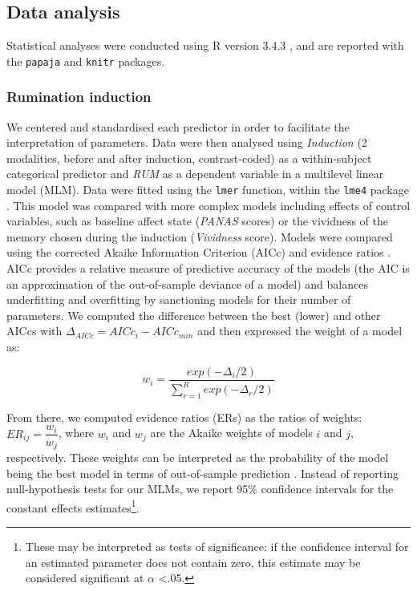 \documentclass[12pt,]{book}
\let\rmarkdownfootnote\footnote%
\def\footnote{\protect\rmarkdownfootnote}
\theoremstyle{definition}
\theoremstyle{definition}
\theoremstyle{definition}
\theoremstyle{remark}
\begin{document}
\subsection{Data analysis}\label{data-analysis}

Statistical analyses were conducted using R version 3.4.3
\citep{R-base}, and are reported with the \texttt{papaja}
\citep{R-papaja} and \texttt{knitr} \citep{R-knitr} packages.

\subsubsection{Rumination induction}\label{rumination-induction-1}

We centered and standardised each predictor in order to facilitate the
interpretation of parameters. Data were then analysed using
\emph{Induction} (2 modalities, before and after induction,
contrast-coded) as a within-subject categorical predictor and \emph{RUM}
as a dependent variable in a multilevel linear model (MLM). Data were
fitted using the \texttt{lmer} function, within the \texttt{lme4}
package \citep{lme4}. This model was compared with more complex models
including effects of control variables, such as baseline affect state
(\emph{PANAS} scores) or the vividness of the memory chosen during the
induction (\emph{Vividness} score). Models were compared using the
corrected Akaike Information Criterion (AICc) and evidence ratios
\citep{Burnham2002, Burnham2011, Hegyi2011}. AICc provides a relative
measure of predictive accuracy of the models (the AIC is an
approximation of the out-of-sample deviance of a model) and balances
underfitting and overfitting by sanctioning models for their number of
parameters. We computed the difference between the best (lower) and
other AICcs with \(\Delta_{AICc}=AICc_{i}-AICc_{min}\) and then
expressed the weight of a model as:

\[w_{i}=\dfrac{exp(-\Delta_{i}/2)}{\sum_{r=1}^{R}exp(-\Delta_{r}/2)}\]

From there, we computed evidence ratios (ERs) as the ratios of weights:
\(ER_{ij} = \dfrac{w_{i}}{w_{j}}\), where \(w_{i}\) and \(w_{j}\) are
the Akaike weights of models \(i\) and \(j\), respectively. These
weights can be interpreted as the probability of the model being the
best model in terms of out-of-sample prediction \citep{Burnham2002}.
Instead of reporting null-hypothesis tests for our MLMs, we report 95\%
confidence intervals for the constant effects estimates\footnote{These
  may be interpreted as tests of significance: if the confidence
  interval for an estimated parameter does not contain zero, this
  estimate may be considered significant at \(\alpha\) \textless{}.05.}.
\end{document}
